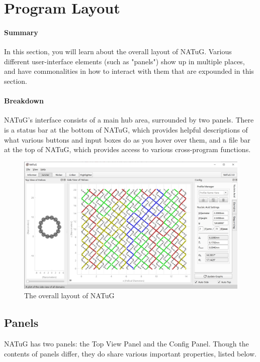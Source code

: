 \documentclass[
titlepage,
fontsize=12pt
]{article}
\begin{document}
	\section{Program Layout}
	
	\paragraph{Summary}
	In this section, you will learn about the overall layout of NATuG. Various different user-interface elements (such as "panels") show up in multiple places, and have commonalities in how to interact with them that are expounded in this section.
	
	\paragraph{Breakdown}
	NATuG’s interface consists of a main hub area, surrounded by two panels. There is a status bar at the bottom of NATuG, which provides helpful descriptions of what various buttons and input boxes do as you hover over them, and a file bar at the top of NATuG, which provides access to various cross-program functions.
	
	\begin{figure}[h]
		\centering
		\caption{The overall layout of NATuG}
		\label{program-layout}
		\includegraphics[width=4.5in]{program-layout.png}
	\end{figure}
	
	\subsection{Panels} \label{sect:panels}
	NATuG has two panels: the Top View Panel and the Config Panel. Though the contents of panels differ, they do share various important properties, listed below.
	
\end{document}
